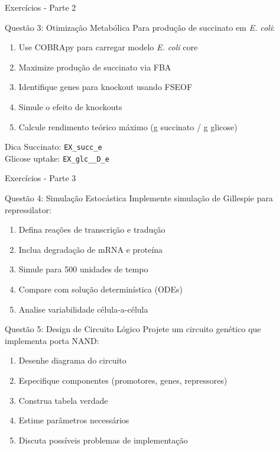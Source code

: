 \begin{frame}{Exercícios - Parte 2}
\begin{block}{Questão 3: Otimização Metabólica}
Para produção de succinato em \textit{E. coli}:

\begin{enumerate}
    \item Use COBRApy para carregar modelo \textit{E. coli} core
    \item Maximize produção de succinato via FBA
    \item Identifique genes para knockout usando FSEOF
    \item Simule o efeito de knockouts
    \item Calcule rendimento teórico máximo (g succinato / g glicose)
\end{enumerate}
\end{block}

\begin{alertblock}{Dica}
Succinato: \texttt{EX\_succ\_e}\\
Glicose uptake: \texttt{EX\_glc\_\_D\_e}
\end{alertblock}
\end{frame}

\begin{frame}{Exercícios - Parte 3}
\begin{block}{Questão 4: Simulação Estocástica}
Implemente simulação de Gillespie para repressilator:

\begin{enumerate}
    \item Defina reações de transcrição e tradução
    \item Inclua degradação de mRNA e proteína
    \item Simule para 500 unidades de tempo
    \item Compare com solução determinística (ODEs)
    \item Analise variabilidade célula-a-célula
\end{enumerate}
\end{block}

\begin{block}{Questão 5: Design de Circuito Lógico}
Projete um circuito genético que implementa porta NAND:

\begin{enumerate}
    \item Desenhe diagrama do circuito
    \item Especifique componentes (promotores, genes, repressores)
    \item Construa tabela verdade
    \item Estime parâmetros necessários
    \item Discuta possíveis problemas de implementação
\end{enumerate}
\end{block}
\end{frame}

